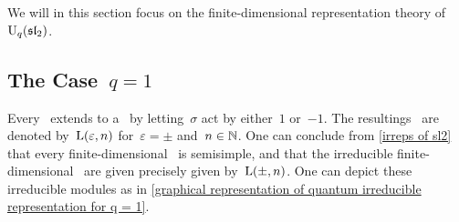 \documentclass[a4paper, 11pt, oneside]{scrartcl}
\begin{document}
We will in this section focus on the finite-dimensional representation theory of~$\operatorname{U}_q(\mathfrak{sl}_2)$.



\subsection{The Case~$q = 1$}
\label{representation theory of quantum U1}

Every~ extends to a~ by letting~$\sigma$ act by either~$1$ or~$-1$.
The resultings~ are denoted by~$\operatorname{L}(\varepsilon, n)$ for~$\varepsilon = \pm$ and~$n \in \mathbb{N}$.
One can conclude from \cref{irreps of sl2} that every finite-dimensional~ is semisimple, and that the irreducible finite-dimensional~ are given precisely given by~$\operatorname{L}(\pm, n)$.
One can depict these irreducible modules as in \cref{graphical representation of quantum irreducible representation for q = 1}.
\end{document}
